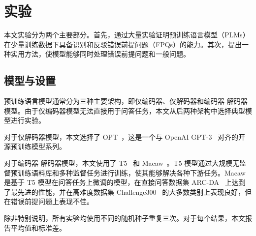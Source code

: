 \section{实验}
\label{sec:exp}
本文实验分为两个主要部分。首先，通过大量实验证明预训练语言模型（PLMs）在少量训练数据下具备识别和反驳错误前提问题（FPQs）的能力。其次，提出一种实用方法，使模型能够同时处理错误前提问题和一般问题。

\subsection{模型与设置}
预训练语言模型通常分为三种主要架构，即仅编码器、仅解码器和编码器-解码器模型。由于仅编码器模型无法直接用于问答任务，本文从后两种架构中选择典型模型进行实验。

对于仅解码器模型，本文选择了 OPT~\cite{zhang2022opt}，这是一个与 OpenAI GPT-3~\cite{brown2020language} 对齐的开源预训练模型系列。

对于编码器-解码器模型，本文使用了 T5~\cite{raffel2020exploring} 和 Macaw~\cite{tafjord2021general}。T5 模型通过大规模无监督预训练语料库和多种监督任务进行训练，使其能够解决各种下游任务。Macaw 是基于 T5 模型在问答任务上微调的模型，在直接问答数据集 ARC-DA~\cite{bhakthavatsalam2021think} 上达到了最先进的性能，并在高难度数据集 Challenge300~\cite{tafjord2021general} 的大多数类别上表现良好，但在错误前提问题上表现不佳。

除非特别说明，所有实验均使用不同的随机种子重复三次。对于每个结果，本文报告平均值和标准差。

\begin{table}
\centering
\caption{召回率和精确率用于衡量错误前提问题的识别能力，准确率为二分类任务的准确率。}
    \label{tab:binary}
\end{table}

